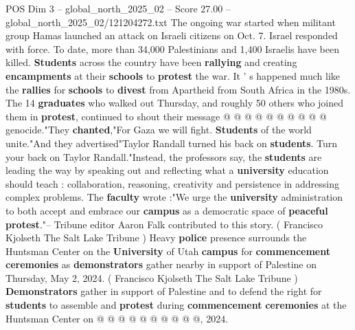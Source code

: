 \begin{textsample}{POS Dim 3 – global\_north\_2025\_02 – Score 27.00 – global\_north\_2025\_02/121204272.txt}
The ongoing war started when militant group Hamas launched an attack on Israeli citizens on Oct. 7.
Israel responded with force.
To date, more than 34,000 Palestinians and 1,400 Israelis have been killed. \textbf{Students} across the country have been \textbf{rallying} and creating \textbf{encampments} at their \textbf{schools} to \textbf{protest} the war.
It ' s happened much like the \textbf{rallies} for \textbf{schools} to \textbf{divest} from Apartheid from South Africa in the 1980s.
The 14 \textbf{graduates} who walked out Thursday, and roughly 50 others who joined them in \textbf{protest}, continued to shout their message @ @ @ @ @ @ @ @ @ @ genocide."They \textbf{chanted},"For Gaza we will fight. \textbf{Students} of the world unite."And they advertised"Taylor Randall turned his back on \textbf{students}.
Turn your back on Taylor Randall."Instead, the professors say, the \textbf{students} are leading the way by speaking out and reflecting what a \textbf{university} education should teach : collaboration, reasoning, creativity and persistence in addressing complex problems.
The \textbf{faculty} wrote :"We urge the \textbf{university} administration to both accept and embrace our \textbf{campus} as a democratic space of \textbf{peaceful} \textbf{protest}."-- Tribune editor Aaron Falk contributed to this story. ( Francisco Kjolseth The Salt Lake Tribune ) Heavy \textbf{police} presence surrounds the Huntsman Center on the \textbf{University} of Utah \textbf{campus} for \textbf{commencement} \textbf{ceremonies} as \textbf{demonstrators} gather nearby in support of Palestine on Thursday, May 2, 2024. ( Francisco Kjolseth The Salt Lake Tribune ) \textbf{Demonstrators} gather in support of Palestine and to defend the right for \textbf{students} to assemble and \textbf{protest} during \textbf{commencement} \textbf{ceremonies} at the Huntsman Center on @ @ @ @ @ @ @ @ @ @, 2024.

\end{textsample}
